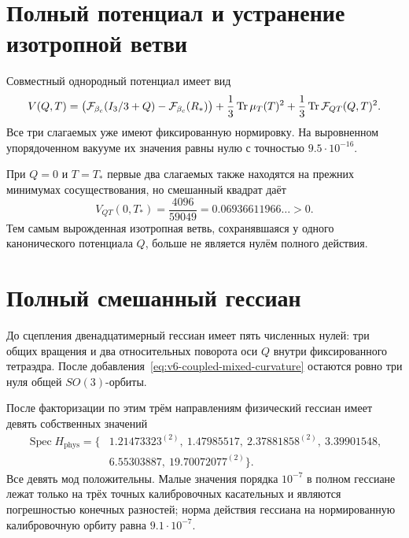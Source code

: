 \section{Полный потенциал и устранение изотропной ветви}

Совместный однородный потенциал имеет вид
\begin{equation}
 V(Q,T)=
 \bigl(\mathcal F_{\beta_c}(I_3/3+Q)-\mathcal F_{\beta_c}(R_*)\bigr)
 +\frac13\operatorname{Tr}\mu_T(T)^2
 +\frac13\operatorname{Tr}\mathcal F_{QT}(Q,T)^2.
 \label{eq:v6-coupled-total-potential}
\end{equation}
Все три слагаемых уже имеют фиксированную нормировку. На выровненном
упорядоченном вакууме их значения равны нулю с точностью
$9.5\cdot10^{-16}$.

При $Q=0$ и $T=T_*$ первые два слагаемых также находятся на прежних
минимумах сосуществования, но смешанный квадрат даёт
\begin{equation}
 V_{QT}(0,T_*)=\frac{4096}{59049}=0.06936611966\ldots>0.
\end{equation}
Тем самым вырожденная изотропная ветвь, сохранявшаяся у одного
канонического потенциала $Q$, больше не является нулём полного действия.

\section{Полный смешанный гессиан}

До сцепления двенадцатимерный гессиан имеет пять численных нулей: три
общих вращения и два относительных поворота оси $Q$ внутри фиксированного
тетраэдра. После добавления~\eqref{eq:v6-coupled-mixed-curvature} остаются
ровно три нуля общей $SO(3)$-орбиты.

После факторизации по этим трём направлениям физический гессиан имеет
девять собственных значений
\begin{equation}
 \begin{split}
 \operatorname{Spec}H_{\mathrm{phys}}=\{&
 1.21473323^{(2)},\ 1.47985517,\
 2.37881858^{(2)},\ 3.39901548,\\
 &6.55303887,\ 19.70072077^{(2)}\}.
 \end{split}
 \label{eq:v6-coupled-physical-hessian-spectrum}
\end{equation}
Все девять мод положительны. Малые значения порядка $10^{-7}$ в полном
гессиане лежат только на трёх точных калибровочных касательных и являются
погрешностью конечных разностей; норма действия гессиана на
нормированную калибровочную орбиту равна $9.1\cdot10^{-7}$.

